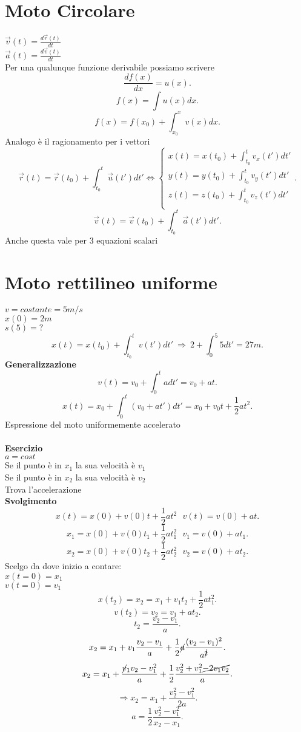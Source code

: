 \documentclass[12px]{article}
\begin{document}
	\section{Moto Circolare}
$\overrightarrow{v}(t) = \frac{d \overrightarrow{r}(t)}{dt}$ \\
$\overrightarrow{a}(t) = \frac{d \overrightarrow{v}(t)}{dt}$\\
Per una qualunque funzione derivabile possiamo scrivere
\[
	\frac{df(x)}{dx} = u(x)
.\] 
\[ f(x) = \int u(x) dx
.\]
\[
	f(x) = f(x_0) + \int_{x_0}^x v(x) dx
.\] 
Analogo è il ragionamento per i vettori
\[
	\overrightarrow{r}(t) = \overrightarrow{r}(t_0) + \int_{t_0}^t \overrightarrow{u}(t') dt'  \Leftrightarrow \begin{cases}
		x(t) = x(t_0) + \int_{t_0}^t v_x(t')dt'\\
		y(t) = y(t_0) + \int_{t_0}^t v_y(t')dt'\\
		z(t) = z(t_0) + \int_{t_0}^t v_z(t')dt'\\
	\end{cases}
.\] 
\[
	\overrightarrow{v}(t) = \overrightarrow{v}(t_0) + \int_{t_0}^t \overrightarrow{a}(t') dt'
.\] 
Anche questa vale per 3 equazioni scalari
\section{Moto rettilineo uniforme}
$v = costante = 5 m/s$\\
 $x(0) = 2m$\\
  $s(5) = ?$\\ 
  \[
	  x(t) = x(t_0) + \int_{t_0}^t v(t')dt' \ \Rightarrow \ 2 + \int_0^5 5dt' = 27 m
  .\] 
  \textbf{Generalizzazione}\\
  \[
	  v(t) = v_0 + \int_0^t adt'= v_0 + at
  .\] 
  \[
  x(t) = x_0 + \int_0^t (v_0 + at')dt' = x_0 + v_0 t+ \frac 1 2 at^2
  .\] 
  Espressione del moto uniformemente accelerato\\
  \newpage\ \\
  \textbf{Esercizio}\\
  $a = cost$\\
  Se il punto è in $x_1$ la sua velocità è $v_1$\\
  Se il punto è in $x_2$ la sua velocità è $v_2$ \\
  Trova l'accelerazione\\
  \textbf{Svolgimento}\\
  \[
	  x(t) = x(0) + v(0)t + \frac 1 2 at^2\ \ \ v(t) = v(0) + at
  .\] 
  \[
  x_1 = x(0) + v(0)t_1 + \frac 1 2 at_1^2\ \ \ v_1 = v(0) + at_1
  .\] 
  \[
  x_2 = x(0) + v(0)t_2 + \frac 1 2 at_2^2\ \ \ v_2 = v(0) + at_2
  .\] 
  Scelgo da dove inizio a contare:\\
  $x(t=0) = x_1$\\
  $v(t=0) = v_1$
  \[
	  x(t_2) = x_2 = x_1 + v_1t_2 + \frac 1 2 a t_1^2
  .\] 
  \[
  v(t_2) = v_2 = v_1 + at_2
  .\] 
  \[
	  t_2 = \frac{v_2 - v_1}{a}
  .\] 
\[
x_2 = x_1 + v_1\frac{v_2-v_1}{ a} + \frac 1 2 \cancel a\frac{(v_2-v_1)^2}{a^{\cancel 2}}

.\] 
\[
x_2 = x_1 + \frac{\cancel v_1v_2 - v_1^2}{a} + \frac 1 2 \frac {v_2^2 + v_1^2 \cancel{- 2v_1v_2}}{a}
.\] 
\[
	\Rightarrow x_2 = x_1 + \frac {v_2^2 - v_1^2}{2a}
.\] 
\[
	a = \frac 1 2 \frac{v_2^2-v_1^2}{x_2-x_1}
.\] 
	
	
\end{document}
